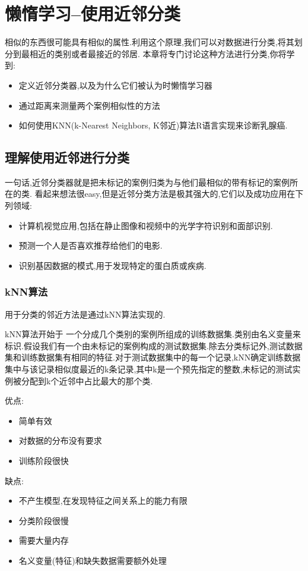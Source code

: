 \documentclass[11pt,a4paper,oneside]{book}
\begin{document}
\chapter{懒惰学习--使用近邻分类}
相似的东西很可能具有相似的属性.利用这个原理,我们可以对数据进行分类,将其划分到最相近的类别或者最接近的邻居.
本章将专门讨论这种方法进行分类,你将学到:
\begin{itemize}
	\item 定义近邻分类器,以及为什么它们被认为时懒惰学习器
	\item 通过距离来测量两个案例相似性的方法
	\item 如何使用KNN(k-Nearest Neighbors, K邻近)算法R语言实现来诊断乳腺癌.
\end{itemize}
\section{理解使用近邻进行分类}
一句话,近邻分类器就是把未标记的案例归类为与他们最相似的带有标记的案例所在的类. 看起来想法很easy,但是近邻分类方法是极其强大的,它们以及成功应用在下列领域:
\begin{itemize}
	\item 计算机视觉应用,包括在静止图像和视频中的光学字符识别和面部识别.
	\item 预测一个人是否喜欢推荐给他们的电影.
	\item 识别基因数据的模式,用于发现特定的蛋白质或疾病.
\end{itemize}
\subsection{kNN算法}
用于分类的邻近方法是通过kNN算法实现的.

kNN算法开始于 一个分成几个类别的案例所组成的训练数据集.类别由名义变量来标识.假设我们有一个由未标记的案例构成的测试数据集.除去分类标记外,测试数据集和训练数据集有相同的特征.对于测试数据集中的每一个记录,kNN确定训练数据集中与该记录相似度最近的k条记录,其中k是一个预先指定的整数,未标记的测试实例被分配到k个近邻中占比最大的那个类.

\begin{tcolorbox}[colback=pink!10!white,colframe=pink!100!black]
优点:
\begin{itemize}
	\item 简单有效
	\item 对数据的分布没有要求
	\item 训练阶段很快
\end{itemize}

缺点:
\begin{itemize}
	\item 不产生模型,在发现特征之间关系上的能力有限
	\item 分类阶段很慢
	\item 需要大量内存
	\item 名义变量(特征)和缺失数据需要额外处理
\end{itemize}
\end{tcolorbox}
\end{document}
